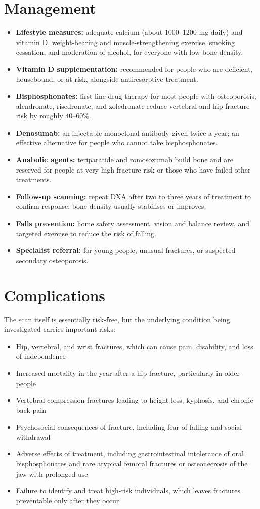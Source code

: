 \section*{Management}
\begin{itemize}
    \item \textbf{Lifestyle measures:} adequate calcium (about 1000--1200 mg daily) and vitamin D, weight-bearing and muscle-strengthening exercise, smoking cessation, and moderation of alcohol, for everyone with low bone density.
    \item \textbf{Vitamin D supplementation:} recommended for people who are deficient, housebound, or at risk, alongside antiresorptive treatment.
    \item \textbf{Bisphosphonates:} first-line drug therapy for most people with osteoporosis; alendronate, risedronate, and zoledronate reduce vertebral and hip fracture risk by roughly 40--60\%.
    \item \textbf{Denosumab:} an injectable monoclonal antibody given twice a year; an effective alternative for people who cannot take bisphosphonates.
    \item \textbf{Anabolic agents:} teriparatide and romosozumab build bone and are reserved for people at very high fracture risk or those who have failed other treatments.
    \item \textbf{Follow-up scanning:} repeat DXA after two to three years of treatment to confirm response; bone density usually stabilises or improves.
    \item \textbf{Falls prevention:} home safety assessment, vision and balance review, and targeted exercise to reduce the risk of falling.
    \item \textbf{Specialist referral:} for young people, unusual fractures, or suspected secondary osteoporosis.
\end{itemize}

\section*{Complications}
The scan itself is essentially risk-free, but the underlying condition being investigated carries important risks:
\begin{itemize}
    \item Hip, vertebral, and wrist fractures, which can cause pain, disability, and loss of independence
    \item Increased mortality in the year after a hip fracture, particularly in older people
    \item Vertebral compression fractures leading to height loss, kyphosis, and chronic back pain
    \item Psychosocial consequences of fracture, including fear of falling and social withdrawal
    \item Adverse effects of treatment, including gastrointestinal intolerance of oral bisphosphonates and rare atypical femoral fractures or osteonecrosis of the jaw with prolonged use
    \item Failure to identify and treat high-risk individuals, which leaves fractures preventable only after they occur
\end{itemize}

